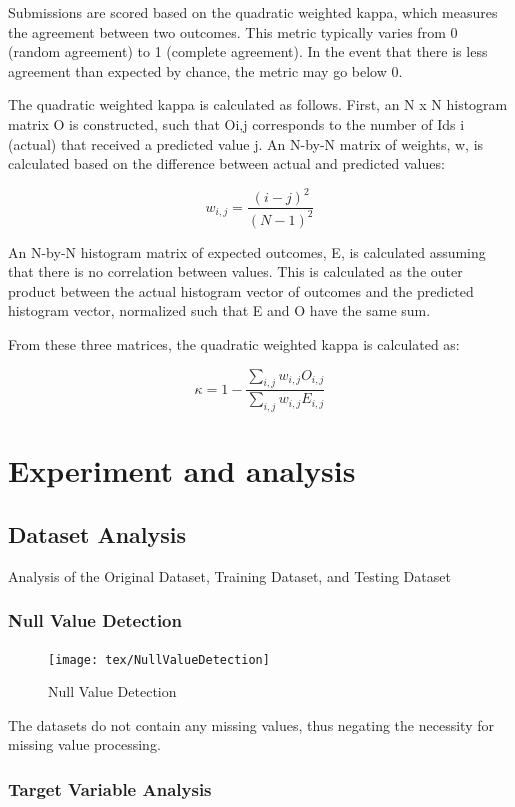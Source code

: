 Submissions are scored based on the quadratic weighted kappa, which measures the agreement between two outcomes. This metric typically varies from 0 (random agreement) to 1 (complete agreement). In the event that there is less agreement than expected by chance, the metric may go below 0.

The quadratic weighted kappa is calculated as follows. First, an N x N histogram matrix O is constructed, such that Oi,j corresponds to the number of Ids i (actual) that received a predicted value j. An N-by-N matrix of weights, w, is calculated based on the difference between actual and predicted values:

\[ w_{i,j} = \frac{(i - j)^2}{(N - 1)^2} \]

An N-by-N histogram matrix of expected outcomes, E, is calculated assuming that there is no correlation between values.  This is calculated as the outer product between the actual histogram vector of outcomes and the predicted histogram vector, normalized such that E and O have the same sum.

From these three matrices, the quadratic weighted kappa is calculated as: 

\[ \kappa = 1 - \frac{\sum_{i,j} w_{i,j} O_{i,j}}{\sum_{i,j} w_{i,j} E_{i,j}} \]

\section{Experiment and analysis}
\subsection{Dataset Analysis}\phantom{...}

Analysis of the Original Dataset, Training Dataset, and Testing Dataset

\subsubsection{Null Value Detection}\phantom{...}

\begin{figure}[H]
	\centering
	\texttt{[image: tex/NullValueDetection]}
	\caption{Null Value Detection}
	\label{fig:nullvaluedetection}
\end{figure}

The datasets do not contain any missing values, thus negating the necessity for missing value processing.

\subsubsection{Target Variable Analysis}\phantom{...}

